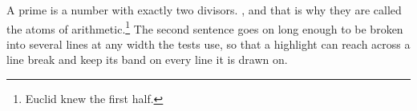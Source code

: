 A prime is a number with exactly two divisors. , and that is why they
are called the atoms of arithmetic.\footnote{Euclid knew the first half.}
The second sentence goes on long enough to be broken into several lines at
any width the tests use, so that a highlight can reach across a line break
and keep its band on every line it is drawn on.
